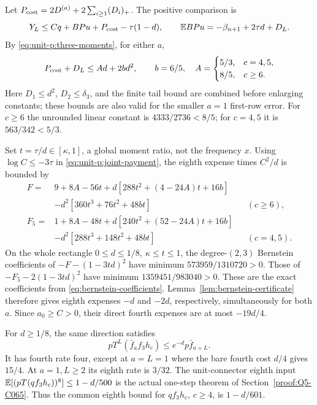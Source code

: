 Let \(P_{\rm cost}=2D^{(a)}+2\sum_{i\ge1}(D_i)_+\).
The positive comparison is
\[
 Y_L\le Cq+BPu+P_{\rm cost}-\tau(1-d),\qquad
 \mathbb E BPu=-\beta_{n+1}+2\tau d+D_L .
\]
By \eqref{eq:unit-p:three-moments}, for either \(a\),
\begin{equation}\label{eq:unit-p:data-16}
P_{\rm cost}+D_L\le Ad+2bd^2,\qquad b=6/5,\quad
 A=\begin{cases}5/3,&c=4,5,\\8/5,&c\ge6.\end{cases}
\end{equation}
Here \(D_1\le d^2\), \(D_2\le\delta_3\), and the finite tail
bound are combined before enlarging constants; these bounds are
also valid for the smaller \(a=1\) first-row error.
For \(c\ge6\) the unrounded linear constant is \(4333/2736<8/5\);
for \(c=4,5\) it is \(563/342<5/3\).

Set \(t=\tau/d\in[\kappa,1]\), a global moment ratio, not the
frequency \(x\). Using \(\log C\le-3\tau\) in
\eqref{eq:unit-p:joint-payment}, the eighth expense times
\(C^2/d\) is bounded by
\begin{equation}\label{eq:unit-p:data-17}
\begin{aligned}
 F={}&9+8A-56t
 +d[288t^2+(4-24A)t+16b]\\
 &-d^2[360t^3+76t^2+48bt] &&(c\ge6),\\
 F_5={}&1+8A-48t
 +d[240t^2+(52-24A)t+16b]\\
 &-d^2[288t^3+148t^2+48bt] &&(c=4,5).
\end{aligned}
\end{equation}
On the whole rectangle \(0\le d\le1/8,\ \kappa\le t\le1\),
the degree-\((2,3)\) Bernstein coefficients of
\(-F-(1-3td)^2\) have minimum \(573959/1310720>0\).
Those of \(-F_5-2(1-3td)^2\) have minimum
\(1359451/983040>0\).
These are the exact coefficients from
\eqref{eq:bernstein-coefficients}. Lemma~\ref{lem:bernstein-certificate}
therefore gives eighth expenses \(-d\) and \(-2d\),
respectively, simultaneously for both \(a\).
Since \(a_0\ge C>0\), their direct fourth expenses are at most
\(-19d/4\).

For \(d\ge1/8\), the same direction satisfies
\[
 pT^L(\bar f_af_3h_c)\le e^{-d}p\bar f_{a+L}.
\]
It has fourth rate four, except at \(a=L=1\) where the bare
fourth cost \(d/4\) gives \(15/4\). At \(a=1,L\ge2\)
its eighth rate is \(3/32\). The unit-connector eighth input
\(\mathbb E[(pT(qf_3h_c))^8]\le1-d/500\) is the actual one-step
theorem of Section~\ref{proof:Q5-C065}.
Thus the common eighth bound for \(qf_3h_c\), \(c\ge4\),
is \(1-d/601\).

